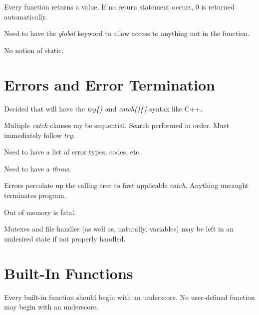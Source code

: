 Every function returns a value.  If no return statement occurs, 0 is returned automatically.

Need to have the \emph{global} keyword to allow access to anything not in the function.

No notion of static.


\section{Errors and Error Termination}
\label{ccik2:seet0}

Decided that will have the \emph{try\{\}} and \emph{catch()\{\}}
syntax like C++.

Multiple \emph{catch} clauses my be sequential.  Search performed in order.  Must immediately
follow \emph{try}.

Need to have a list of error types, codes, etc.

Need to have a \emph{throw}.

Errors percolate up the calling tree to first applicable \emph{catch}.  Anything uncaught terminates program.

Out of memory is fatal.

Mutexes and file handles (as well as, naturally, variables) may be left in an undesired state if
not properly handled.


\section{Built-In Functions}
\label{ccik2:sbif0}

Every built-in function should begin with an underscore.  No user-defined function may begin
with an underscore.


